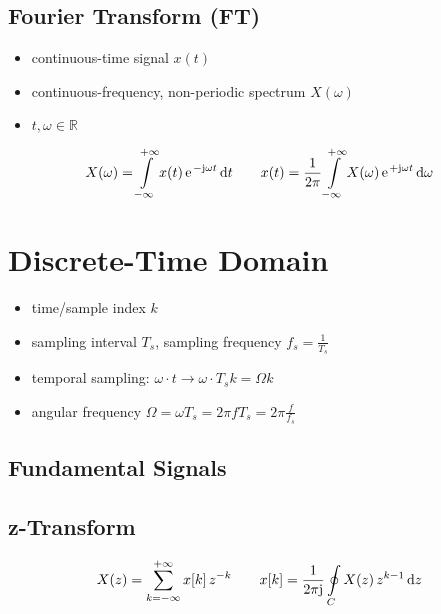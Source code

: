 \documentclass[landscape,columns=2]{cheatsheet} %
\begin{document}
\subsection{Fourier Transform (FT)}
%
\begin{itemize}
\setlength\itemsep{-0.5em}
\item continuous-time signal $x(t)$
%
\item continuous-frequency, non-periodic spectrum $X(\omega)$
%
\item $t, \omega\in\mathbb{R}$
%
\end{itemize}
%
\begin{align*}
X(\omega) = \int\limits_{-\infty}^{+\infty} x(t) \,\e^{-\im \omega t}\,\mathrm{d}t
\qquad
x(t) = \frac{1}{2\pi}\int\limits_{-\infty}^{+\infty} X(\omega) \,\e^{+\im \omega t}\,\mathrm{d}\omega
\end{align*}










\section{Discrete-Time Domain}
%
\begin{itemize}
\setlength\itemsep{-0.5em}
%
\item time/sample index $k$
%
\item sampling interval $T_s$, sampling frequency $f_s = \frac{1}{T_s}$
%
\item temporal sampling: $\omega \cdot t \rightarrow \omega \cdot T_s k = \Omega k$
%
\item angular frequency $\Omega = \omega T_s = 2 \pi f T_s = 2 \pi \frac{f}{f_s}$
%
\end{itemize}


\subsection{Fundamental Signals}

\subsection{z-Transform}
%
\begin{align*}
X(z) = \sum\limits_{k=-\infty}^{+\infty} x[k] \,z^{-k}
\qquad
x[k] = \frac{1}{2\pi\im}\oint\limits_{C}^{} X(z) \,z^{k-1}\,\mathrm{d}z
\end{align*}
\end{document}
